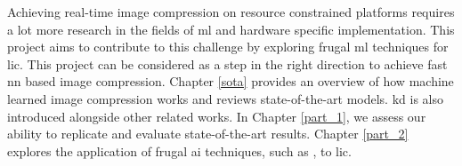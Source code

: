 Achieving real-time image compression on resource constrained platforms requires a lot more research in the fields of \acrshort{ml} and hardware specific implementation. This project aims to contribute to this challenge by exploring frugal \acrshort{ml} techniques for \acrshort{lic}. This project can be considered as a step in the right direction to achieve fast \acrshort{nn} based image compression. Chapter \ref{sota} provides an overview of how machine learned image compression works and reviews state-of-the-art models. \acrfull{kd} is also introduced alongside other related works. In Chapter \ref{part_1}, we assess our ability to replicate and evaluate state-of-the-art results. Chapter \ref{part_2} explores the application of frugal \acrfull{ai} techniques, such as , to \acrshort{lic}.